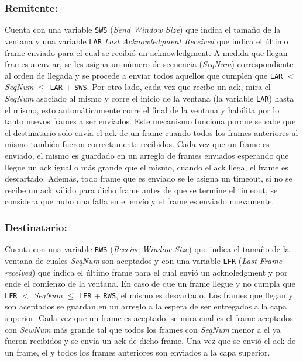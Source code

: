 \documentclass[10pt,a4paper]{article}
\begin{document}
\subsubsection{Remitente:}
Cuenta con una variable \texttt{SWS} (\textit{Send Window Size}) que indica el tamaño de la ventana y una variable \texttt{LAR} \textit{Last Acknowledgment Received} que indica el último frame enviado para el cual se recibió un acknowledgment. A medida que llegan frames a enviar, se les asigna un número de secuencia (\textit{SeqNum}) correspondiente al orden de llegada y se procede a enviar todos aquellos que cumplen que \texttt{LAR} $<$ \textit{SeqNum} $\leq$ \texttt{LAR} + \texttt{SWS}. Por otro lado, cada vez que recibe un ack, mira el \textit{SeqNum} asociado al mismo y corre el inicio de la ventana (la variable \texttt{LAR}) hasta el mismo, esto automáticamente corre el final de la ventana y habilita por lo tanto nuevos frames a ser enviados. Este mecanismo funciona porque se sabe que el destinatario solo envía el ack de un frame cuando todos los frames anteriores al mismo también fueron correctamente recibidos. Cada vez que un frame es enviado, el mismo es guardado en un arreglo de frames enviados esperando que llegue un ack igual o más grande que el mismo, cuando el ack llega, el frame es descartado. Además, todo frame que es enviado se le asigna un timeout, si no se recibe un ack válido para dicho frame antes de que se termine el timeout, se considera que hubo una falla en el envío y el frame es enviado nuevamente.

\subsubsection{Destinatario:}
Cuenta con una variable \texttt{RWS} (\textit{Receive Window Size}) que indica el tamaño de la ventana de cuales \textit{SeqNum} son aceptados y con una variable \texttt{LFR} (\textit{Last Frame received}) que indica el último frame para el cual envió un acknoledgment y por ende el comienzo de la ventana. En caso de que un frame llegue y no cumpla que \texttt{LFR} $<$ \textit{SeqNum} $\leq$ \texttt{LFR} + \texttt{RWS}, el mismo es descartado. Los frames que llegan y son aceptados se guardan en un arreglo a la espera de ser entregados a la capa superior. Cada vez que un frame es aceptado, se mira cual es el frame aceptados con \textit{SewNum} más grande tal que todos los frames con \textit{SeqNum} menor a el ya fueron recibidos y se envía un ack de dicho frame. Una vez que se envió el ack de un frame, el y todos los frames anteriores son enviados a la capa superior. \\
\end{document}

